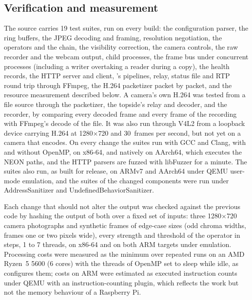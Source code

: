 \subsection{Verification and measurement}\label{sec:verification}

The source carries 19 test suites, run on every build: the
configuration parser, the
ring buffers, the JPEG decoding and framing, resolution negotiation,
the operators and
the chain, the visibility correction, the camera controls, the raw
recorder and the
webcam output, child processes, the frame bus under concurrent
processes (including a
writer overtaking a reader during a copy), the health records, the
HTTP server and
client, \hellion{}'s pipelines, relay, status file and RTP round trip
through FFmpeg, the
H.264 packetizer packet by packet, and the resource measurement
described below. A
camera's own H.264 was tested from a file source through the
packetizer, the topside's
relay and decoder, and the recorder, by comparing every decoded frame
and every frame
of the recording with FFmpeg's decode of the file. It was also run through
V4L2 from a loopback device carrying H.264 at 1280$\times$720 and 30~frames per
second, but not yet on a camera that encodes. On every change the
suites run with GCC
and Clang, with and without OpenMP, on x86-64, and natively on
AArch64, which executes
the NEON paths, and the HTTP parsers are fuzzed with libFuzzer for a minute. The
suites also run, as built for release, on ARMv7 and AArch64 under QEMU user-mode
emulation, and the suites of the changed components were run under
AddressSanitizer
and UndefinedBehaviorSanitizer.

Each change that should not alter the output was checked against the
previous code by
hashing the output of both over a fixed set of inputs: three
1280$\times$720 camera
photographs and synthetic frames of edge-case sizes (odd chroma
  widths, frames one or
two pixels wide), every strength and threshold of the operator in steps, 1 to 7
threads, on x86-64 and on both ARM targets under emulation.
Processing costs were measured as the minimum over repeated runs on
an AMD Ryzen~5
5600 (6 cores) with the threads of OpenMP set to sleep while idle, as \eeye{}
configures them; costs on ARM were estimated as executed instruction
counts under QEMU
with an instruction-counting plugin, which reflects the work but not the memory
behaviour of a Raspberry Pi.

